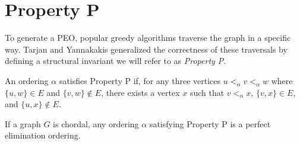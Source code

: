 \section{Property P}

To generate a PEO, popular greedy algorithms traverse the graph in a specific way. Tarjan and Yannakakis \cite{TarjanYannakakis1984} generalized the correctness of these traversals by defining a structural invariant we will refer to as \textit{Property P}.

\begin{definition}[Property P]
An ordering $\alpha$ satisfies Property P if, for any three vertices $u <_\alpha v <_\alpha w$ where $\{u, w\} \in E$ and $\{v, w\} \notin E$, there exists a vertex $x$ such that $v <_\alpha x$, $\{v, x\} \in E$, and $\{u, x\} \notin E$.
\end{definition}

\begin{theorem}
\label{thm:property_p_peo}
If a graph $G$ is chordal, any ordering $\alpha$ satisfying Property P is a perfect elimination ordering.
\end{theorem}

